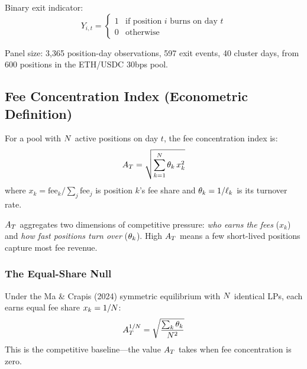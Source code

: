 Binary exit indicator:
\begin{equation}\label{eq:exit-indicator}
  Y_{i,t} = \begin{cases}
    1 & \text{if position } i \text{ burns on day } t \\
    0 & \text{otherwise}
  \end{cases}
\end{equation}

Panel size: 3{,}365 position-day observations, 597 exit events, 40 cluster
days, from 600 positions in the ETH/USDC 30bps pool.


\subsection{Fee Concentration Index (Econometric Definition)}\label{subsec:econ-fci}

\begin{definition}\label{def:econ-fci}
For a pool with $N$ active positions on day $t$, the fee concentration
index is:
\begin{equation}\label{eq:econ-at}
  A_T = \sqrt{\sum_{k=1}^{N} \theta_k \, x_k^2}
\end{equation}
where $x_k = \text{fee}_k / \sum_j \text{fee}_j$ is position $k$'s fee share
and $\theta_k = 1/\ell_k$ is its turnover rate.
\end{definition}

$A_T$ aggregates two dimensions of competitive pressure: \emph{who earns the
fees} ($x_k$) and \emph{how fast positions turn over} ($\theta_k$). High
$A_T$ means a few short-lived positions capture most fee revenue.

\subsubsection{The Equal-Share Null}

\begin{definition}\label{def:econ-null}
Under the Ma \& Crapis (2024) symmetric equilibrium with $N$ identical
LPs, each earns equal fee share $x_k = 1/N$:
\begin{equation}\label{eq:econ-null}
  A_T^{1/N} = \sqrt{\frac{\sum_k \theta_k}{N^2}}
\end{equation}
This is the competitive baseline---the value $A_T$ takes when fee
concentration is zero.
\end{definition}

